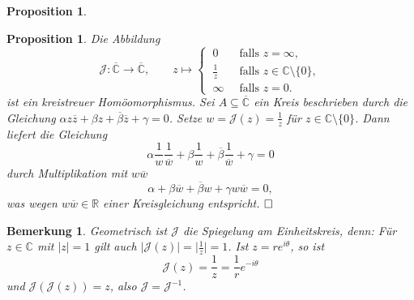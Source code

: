 \documentclass[11pt]{book}
\numberwithin{dummy}{section}
\newtheorem{proposition}[theorem]{Proposition}
\newtheorem{remark}[theorem]{Bemerkung}
\theoremstyle{nonumberbreak}
\newenvironment{pr}[1][]{\ifthenelse{\equal{#1}{}}{\proof}{\proof[#1]}\rm}{\endproof}
\newcommand{\C}{\mathbb{C}}
\newcommand{\CC}{\overline{\mathbb{C}}}
\newcommand{\la}{\longrightarrow}
\begin{document}
\begin{spacing}{1.4}
\begin{proposition}
\hypertarget{propeinszweivier}{}

\end{proposition}

\begin{proposition}
Die Abbildung 
$$\mathcal{J}: \CC \la \CC, \qquad z \mapsto \begin{cases} \ 0 & \ \textrm{ falls } z = \infty, \\ \ \frac{1}{z} & \ \textrm{ falls } z \in \C \setminus \{0\}, \\ \ \infty & \ \textrm{ falls }z=0. \end{cases}$$
ist ein kreistreuer Homöomorphismus.
\begin{pr}
Sei $A \subseteq \CC$ ein Kreis beschrieben durch die Gleichung $\alpha z \overline{z} + \beta z + \overline{\beta} \overline{z} + \gamma = 0$. Setze $w= \mathcal{J}(z) = \frac{1}{z}$ für $z \in \C \setminus \{0\}$. Dann liefert die Gleichung 
$$\alpha \frac{1}{w} \frac{1}{\overline{w}} + \beta \frac{1}{w} + \overline{\beta} \frac{1}{\overline{w}} + \gamma = 0$$
durch Multiplikation mit $w\overline{w}$ 
$$\alpha + \beta \overline{w} + \overline{\beta} w + \gamma w \overline{w} = 0,$$
was wegen $w \overline{w} \in \mathbb{R}$ einer Kreisgleichung entspricht. $\hfill \Box$

\end{pr}

\end{proposition}


\begin{remark}
Geometrisch ist $\mathcal{J}$ die Spiegelung am Einheitskreis, denn: Für $z \in \C$ mit $\vert z \vert =1$ gilt auch $\vert \mathcal{J}(z) \vert = \big \vert \frac{1}{z} \big\vert = 1$. Ist $z= r e^{i \theta}$, so ist
$$ \mathcal{J}(z) =  \frac{1}{z} = \frac{1}{r} e^{-i\theta}$$ und $\mathcal{J}(\mathcal{J}(z)) = z$, also $\mathcal{J} = \mathcal{J}^{-1}$.

\end{remark}




\end{spacing}
\end{document}
